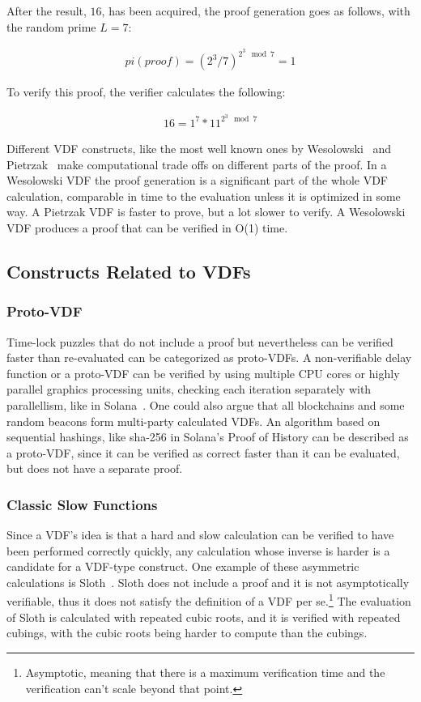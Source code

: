 After the result, \(16\), has been acquired, the proof generation goes as follows, with the random prime \(L=7\):

\begin{align*}
	pi (\mathit{proof}) = (2^3/7)^{2^3\mod 7} = 1
\end{align*}

To verify this proof, the verifier calculates the following:

\begin{align*}
	16 = 1^7 * 11^{2^3 \mod 7}
\end{align*}

Different VDF constructs, like the most well known ones by Wesolowski~\cite{Wesolowski2019-ro} and Pietrzak~\cite{Pietrzak2018-xs} make computational trade offs on different parts of the proof. In a Wesolowski VDF the proof generation is a significant part of the whole VDF calculation, comparable in time to the evaluation unless it is optimized in some way. A Pietrzak VDF is faster to prove, but a lot slower to verify. A Wesolowski VDF produces a proof that can be verified in O(1) time.

\subsection{Constructs Related to VDFs}
\subsubsection{Proto-VDF}
Time-lock puzzles that do not include a proof but nevertheless can be verified faster than re-evaluated can be categorized as proto-VDFs. A non-verifiable delay function or a proto-VDF can be verified by using multiple CPU cores or highly parallel graphics processing units, checking each iteration separately with parallellism, like in Solana~\cite{Yakovenko2018-zn}. One could also argue that all blockchains and some random beacons form multi-party calculated VDFs. An algorithm based on sequential hashings, like sha-256 in Solana's Proof of History can be described as a proto-VDF, since it can be verified as correct faster than it can be evaluated, but does not have a separate proof.

\subsubsection{Classic Slow Functions}
Since a VDF's idea is that a hard and slow calculation can be verified to have been performed correctly quickly, any calculation whose inverse is harder is a candidate for a VDF-type construct. One example of these asymmetric calculations is Sloth~\cite{Boneh2018-sm}. Sloth does not include a proof and it is not asymptotically verifiable, thus it does not satisfy the definition of a VDF per se.\footnote{Asymptotic, meaning that there is a maximum verification time and the verification can't scale beyond that point.} The evaluation of Sloth is calculated with repeated cubic roots, and it is verified with repeated cubings, with the cubic roots being harder to compute than the cubings.

